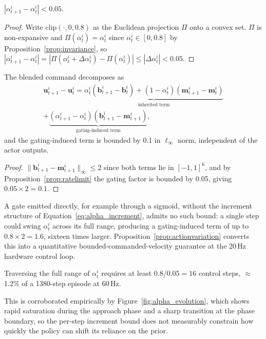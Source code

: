 \begin{proposition}\label{prop:ratelimit}
$|\alpha_{t+1}^i - \alpha_t^i| < 0.05$.
\end{proposition}
\begin{proof}
Write $\mathrm{clip}(\cdot,0,0.8)$ as the Euclidean projection $\Pi$ onto a convex set. $\Pi$ is
non-expansive and $\Pi(\alpha_t^i) = \alpha_t^i$ since $\alpha_t^i \in [0,0.8]$ by
Proposition~\ref{prop:invariance}, so $|\alpha_{t+1}^i - \alpha_t^i| = |\Pi(\alpha_t^i + \Delta\alpha_t^i) -
\Pi(\alpha_t^i)| \le |\Delta\alpha_t^i| < 0.05$.
\end{proof}

\begin{proposition}\label{prop:actionvariation}
The blended command decomposes as
\begin{multline}
\mathbf{u}_{t+1}^i - \mathbf{u}_t^i = \underbrace{\alpha_t^i(\mathbf{b}_{t+1}^i - \mathbf{b}_t^i) + (1-\alpha_t^i)(\mathbf{m}_{t+1}^i - \mathbf{m}_t^i)}_{\text{inherited term}} \\
+ \underbrace{(\alpha_{t+1}^i - \alpha_t^i)(\mathbf{b}_{t+1}^i - \mathbf{m}_{t+1}^i)}_{\text{gating-induced term}},
\label{eq:alpha_decomposition}
\end{multline}
and the gating-induced term is bounded by 0.1 in $\ell_\infty$ norm, independent of the actor outputs.
\end{proposition}
\begin{proof}
$\lVert \mathbf{b}_{t+1}^i - \mathbf{m}_{t+1}^i \rVert_\infty \le 2$ since both terms lie in $[-1,1]^6$, and by
Proposition~\ref{prop:ratelimit} the gating factor is bounded by 0.05, giving $0.05 \times 2 = 0.1$.
\end{proof}

A gate emitted directly, for example through a sigmoid, without the increment structure of
Equation~\eqref{eq:alpha_increment}, admits no such bound: a single step could swing $\alpha_t^i$ across its
full range, producing a gating-induced term of up to $0.8 \times 2 = 1.6$, sixteen times larger.
Proposition~\ref{prop:actionvariation} converts this into a quantitative bounded-commanded-velocity
guarantee at the 20\,Hz hardware control loop.

\begin{proposition}\label{prop:nonrestrictive}
Traversing the full range of $\alpha_t^i$ requires at least $0.8/0.05 = 16$ control steps,
$\approx$1.2\% of a 1380-step episode at 60\,Hz.
\end{proposition}
This is corroborated empirically by Figure~\ref{fig:alpha_evolution}, which shows rapid saturation
during the approach phase and a sharp transition at the phase boundary, so the per-step increment
bound does not measurably constrain how quickly the policy can shift its reliance on the prior.

